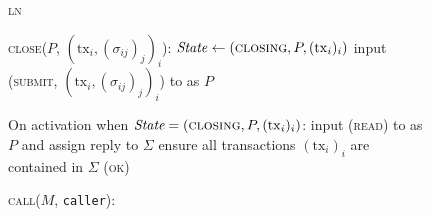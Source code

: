\begin{figure}[H]
\begin{processbox}{\textsc{ln}}
\begin{algorithmic}[1]
      \State \textsc{close}($P$, $(\mathrm{tx}_i, (\sigma_{ij})_j)_i$):
      \Indent
          \State $\mathit{State} \gets (\textsc{closing}, P, (\mathrm{tx}_i)_i)$
          \State input (\textsc{submit}, $(\mathrm{tx}_i, (\sigma_{ij})_j)_i$)
          to \ledger as $P$
      \EndIndent
      \Statex

      \State On activation when $\textit{State} = (\textsc{closing}, P,
      (\mathrm{tx}_i)_i)$:
      \Indent
        \State input (\textsc{read}) to \ledger as $P$ and assign reply to
        $\Sigma$
        \State ensure all transactions $(\mathrm{tx}_i)_i$ are contained in
        $\Sigma$
        \State \Return (\textsc{ok})
      \EndIndent
      \Statex

      \State \textsc{call}($M$, \texttt{caller}):
      \Indent
        \State \TODO{}
      \EndIndent
    \end{algorithmic}
  \end{processbox}
  \caption{}
  \label{code:ln}
\end{figure}
